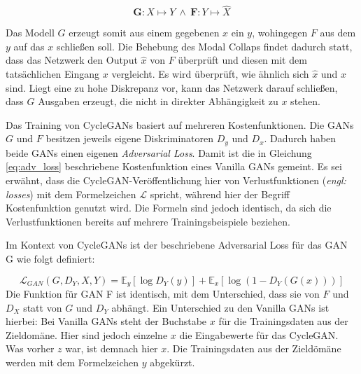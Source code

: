 \begin{equation}
	\mathbf{G}: X\mapsto Y \: \wedge \: \mathbf{F}: Y\mapsto \hat{X}
\end{equation}

Das Modell $G$ erzeugt somit aus einem gegebenen $x$ ein $y$, wohingegen $F$ aus dem $y$ auf das $x$ schließen soll. Die Behebung des Modal Collaps findet dadurch statt, dass das Netzwerk den Output $\hat{x}$ von $F$ überprüft und diesen mit dem tatsächlichen Eingang $x$ vergleicht. Es wird überprüft, wie ähnlich sich $\hat{x}$ und $x$ sind. Liegt eine zu hohe Diskrepanz vor, kann das Netzwerk darauf schließen, dass $G$ Ausgaben erzeugt, die nicht in direkter Abhängigkeit zu $x$ stehen. \cite{cycleGAN}

Das Training von \acp{CycleGAN} basiert auf mehreren Kostenfunktionen. Die \acp{GAN} $G$ und $F$ besitzen jeweils eigene Diskriminatoren $D_y$ und $D_x$. Dadurch haben beide \acp{GAN} einen eigenen \emph{Adversarial Loss}. Damit ist die in Gleichung \ref{eq:adv_loss} beschriebene Kostenfunktion eines Vanilla \acp{GAN} gemeint. Es sei erwähnt, dass die \ac{CycleGAN}-Veröffentlichung hier von Verlustfunktionen (\emph{engl: losses}) mit dem Formelzeichen $\mathcal{L}$ spricht, während hier der Begriff Kostenfunktion genutzt wird. Die Formeln sind jedoch identisch, da sich die Verlustfunktionen bereits auf mehrere Trainingsbeispiele beziehen. \cite{cycleGAN}

Im Kontext von \acp{CycleGAN} ist der beschriebene Adversarial Loss für das \ac{GAN} G wie folgt definiert: \cite{cycleGAN}

\begin{equation}
	\mathcal{L}_{GAN}(G, D_Y, X, Y) = \mathbb{E}_y[\log{D_Y(y)}] + \mathbb{E}_x[\log(1-D_Y(G(x)))]
\end{equation}
Die Funktion für \ac{GAN} F ist identisch, mit dem Unterschied, dass sie von $F$ und $D_X$ statt von $G$ und $D_Y$ abhängt. Ein Unterschied zu den Vanilla \acp{GAN} ist hierbei: Bei Vanilla \acp{GAN} steht der Buchstabe $x$ für die Trainingsdaten aus der Zieldomäne. Hier sind jedoch einzelne $x$ die Eingabewerte für das \ac{CycleGAN}. Was vorher $z$ war, ist demnach hier $x$. Die Trainingsdaten aus der Zieldömäne werden mit dem Formelzeichen $y$ abgekürzt. \cite{cycleGAN}

